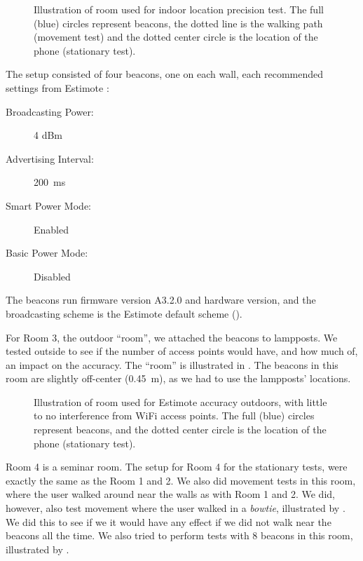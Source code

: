 \begin{figure}[!htb]
  \centering
  
  \caption{Illustration of room used for indoor location precision test. The full (blue) circles represent beacons, the dotted line is the walking path (movement test) and the dotted center circle is the location of the phone (stationary test).}
  \label{fig:precisiontest:illustration}
\end{figure}

The setup consisted of four beacons, one on each wall, 
each recommended settings from Estimote \cite{estimote:settings}:
\begin{description}
  \item[Broadcasting Power:]{\num{4} dBm}
  \item[Advertising Interval:]{\SI{200}{\milli\second}}
  \item[Smart Power Mode:]{Enabled}
  \item[Basic Power Mode:]{Disabled}
\end{description}
The beacons run firmware version A3.2.0 and hardware version,
and the broadcasting scheme is the Estimote default scheme (\ie). 

For Room 3, the outdoor ``room'',
we attached the beacons to lampposts. 
We tested outside to see if the number of access points would have, and how much of, 
an impact on the accuracy. 
The ``room'' is illustrated in . 
The beacons in this room are slightly off-center (\SI{0.45}{\meter}), 
as we had to use the lampposts' locations. 

\begin{figure}[!htb]
  \centering
  
  \caption{Illustration of room used for Estimote accuracy outdoors, with little to no interference from WiFi access points. The full (blue) circles represent beacons, and the dotted center circle is the location of the phone (stationary test).}
  \label{fig:outdoortest}
\end{figure}

Room 4 is a seminar room. 
The setup for Room 4 for the stationary tests,
were exactly the same as the Room 1 and 2. 
We also did movement tests in this room, 
where the user walked around near the walls as with Room 1 and 2. 
We did, however, also test movement where the user walked in a \emph{bowtie},
illustrated by . 
We did this to see if we it would have any effect if we did not walk near the beacons all the time. 
We also tried to perform tests with \num{8} beacons in this room, 
illustrated by . 

